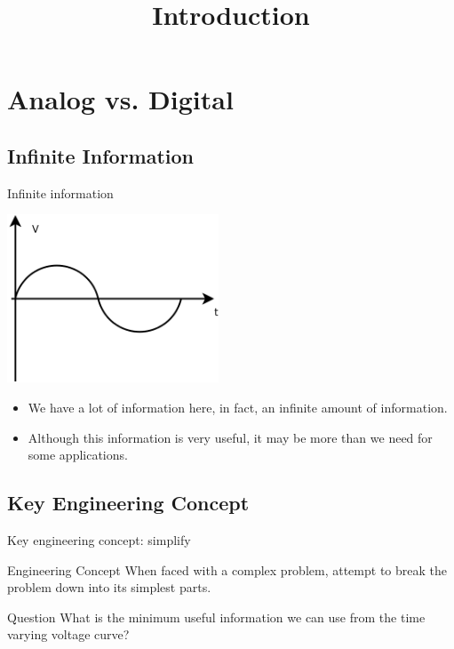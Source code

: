 \usepackage{graphicx}
\title{Introduction}


\section{Analog vs. Digital}

\subsection {Infinite Information}

\begin{frame}{Infinite information}
  \begin{center}
    \includegraphics[height=5cm]{AnalogCurve.png}
  \end{center}
\end{frame}

\begin{itemize}
  \item We have a lot of information here, in fact, an infinite amount of information.
  \item Although this information is very useful, it may be more than we need for some applications.
\end{itemize}

\subsection{Key Engineering Concept}

\begin{frame}{Key engineering concept: simplify}
  \begin{block}{Engineering Concept}
    When faced with a complex problem, attempt to break the problem down into its simplest parts.
  \end{block}
  \begin{block}{Question}
    What is the minimum useful information we can use from the time varying voltage curve?
  \end{block}
\end{frame}

